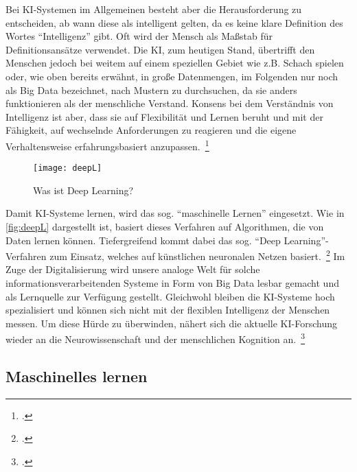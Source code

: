 Bei \ac{KI}-Systemen im Allgemeinen besteht aber die Herausforderung zu entscheiden, ab wann diese als intelligent gelten, da es keine klare Definition des Wortes \enquote{Intelligenz} gibt.
Oft wird der Mensch als Maßstab für Definitionsansätze verwendet. Die \ac{KI}, zum heutigen Stand, übertrifft den Menschen jedoch bei weitem auf einem speziellen Gebiet wie z.B. Schach spielen
oder, wie oben bereits erwähnt, in große Datenmengen, im Folgenden nur noch als Big Data bezeichnet, nach Mustern zu durchsuchen, da sie anders funktionieren als der menschliche Verstand.
Konsens bei dem Verständnis von Intelligenz ist aber, dass sie auf Flexibilität und Lernen beruht und mit der Fähigkeit, auf wechselnde Anforderungen zu reagieren und die eigene 
Verhaltensweise erfahrungsbasiert anzupassen.~\footcite[\vglf][]{Lenzen.2020} 

\begin{figure}[H]
    \centering
    \captionsetup{justification=centering}
    \texttt{[image: deepL]}
    \caption[Was ist Deep Learning?]{Was ist Deep Learning?\footnotemark}
    \label{fig:deepL}
\end{figure}

Damit \ac{KI}-Systeme lernen, wird das sog. \enquote{maschinelle Lernen} eingesetzt. Wie in \autoref{fig:deepL} dargestellt ist, basiert dieses Verfahren auf Algorithmen, die von Daten lernen können. Tiefergreifend kommt dabei das 
sog. \enquote{Deep Learning}-Verfahren zum Einsatz, welches auf künstlichen neuronalen Netzen basiert.~\footcite[\vglf][]{Lenzen.2020}
Im Zuge der Digitalisierung wird unsere analoge Welt für solche informationsverarbeitenden Systeme in Form von Big Data lesbar gemacht und als Lernquelle zur Verfügung gestellt.
Gleichwohl bleiben die \ac{KI}-Systeme hoch spezialisiert und können sich nicht mit der flexiblen Intelligenz der Menschen messen. Um diese Hürde zu überwinden, nähert sich die 
aktuelle \ac{KI}-Forschung wieder an die Neurowissenschaft und der menschlichen Kognition an.~\footcite[\vglf][]{Lenzen.2020}

\subsection{Maschinelles lernen}

